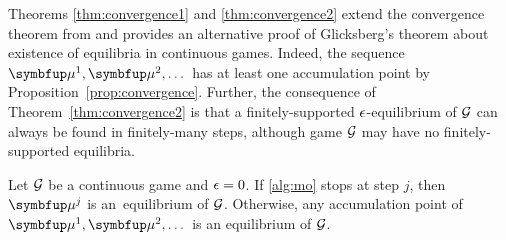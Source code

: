 Theorems \ref{thm:convergence1} and \ref{thm:convergence2} extend the convergence theorem from \cite{adam.horčík.ea:double} and provides an alternative proof of Glicksberg's theorem \cite{Glicksberg52} about existence of equilibria in continuous games. Indeed, the sequence $\bmu^1,\bmu^2,\dots$ has at least one accumulation point by Proposition~\ref{prop:convergence}. Further, the consequence of Theorem~\ref{thm:convergence2} is that a finitely-supported $\epsilon$-equilibrium of $\mathcal{G}$ can always  be found in finitely-many steps, although game $\mathcal{G}$ may have no finitely-supported equilibria.

\begin{theorem}\label{thm:convergence1}
	Let $\mathcal{G}$ be a continuous game and $\epsilon=0$. If \cref{alg:mo} stops at step $j$, then $\bmu^j$ is an~equilibrium of $\mathcal{G}$. Otherwise, any accumulation point of $\bmu^1,\bmu^2,\dots$ is an equilibrium of $\mathcal{G}$.
\end{theorem}
